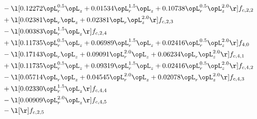 \begin{alignat}{2}
& - \l[  0.12272 \opL_r^{0.5} \opL_z +  0.01534 \opL_r^{1.5} \opL_z +  0.10738 \opL_r^{0.5} \opL_z^{2.0}  \r] f_{c,2,2} \nonumber \\ 
& + \l[  0.02381 \opL_r \opL_z +  0.02381 \opL_r \opL_z^{2.0}  \r] f_{c,2,3} \nonumber \\ 
& - \l[  0.00383 \opL_r^{1.5} \opL_z  \r] f_{c,2,4} \nonumber \\ 
& + \l[  0.11735 \opL_r^{0.5} \opL_z +  0.06989 \opL_r^{1.5} \opL_z +  0.02416 \opL_r^{0.5} \opL_z^{2.0}  \r] f_{4,0} \nonumber \\ 
& - \l[  0.17143 \opL_r \opL_z +  0.09091 \opL_r^{2.0} \opL_z +  0.06234 \opL_r \opL_z^{2.0}  \r] f_{c,4,1} \nonumber \\ 
& + \l[  0.11735 \opL_r^{0.5} \opL_z +  0.09319 \opL_r^{1.5} \opL_z +  0.02416 \opL_r^{0.5} \opL_z^{2.0}  \r] f_{c,4,2} \nonumber \\ 
& - \l[  0.05714 \opL_r \opL_z +  0.04545 \opL_r^{2.0} \opL_z +  0.02078 \opL_r \opL_z^{2.0}  \r] f_{c,4,3} \nonumber \\ 
& + \l[  0.02330 \opL_r^{1.5} \opL_z  \r] f_{c,4,4} \nonumber \\ 
& - \l[  0.00909 \opL_r^{2.0} \opL_z  \r] f_{c,4,5} \nonumber \\ 
& - \l[  \r] f_{c,2,5} \nonumber \\ 
\end{alignat} 


